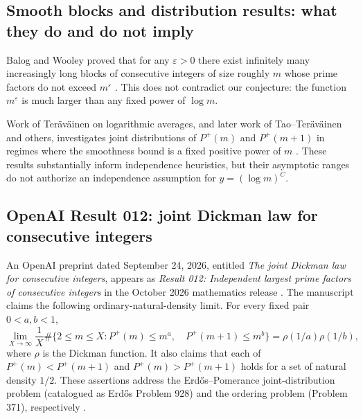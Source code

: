 \documentclass[11pt,letterpaper]{article}
\theoremstyle{remark}
\newcommand{\GPF}{P^{+}}
\begin{document}
\subsection{Smooth blocks and distribution results: what they do and do not imply}
Balog and Wooley proved that for any $\varepsilon>0$ there exist
infinitely many increasingly long blocks of consecutive integers
of size roughly $m$ whose prime factors do not exceed $m^\varepsilon$
\cite{BalogWooley}. This does not contradict our conjecture:
the function $m^\varepsilon$ is much larger than any fixed
power of $\log m$.

Work of Ter\"av\"ainen on logarithmic averages, and later work
of Tao--Ter\"av\"ainen and others, investigates joint distributions
of $P^+(m)$ and $P^+(m+1)$ in regimes where the smoothness bound
is a fixed positive power of $m$ \cite{Teravainen2018,TaoTeravainen2019,Wang2021}.
These results substantially inform independence heuristics, but their
asymptotic ranges do not authorize an independence assumption for
$y=(\log m)^C$.

\subsection{OpenAI Result 012: joint Dickman law for consecutive integers}
\label{subsec:result012}
An OpenAI preprint dated September 24, 2026, entitled
\emph{The joint Dickman law for consecutive integers}, appears as
\emph{Result 012: Independent largest prime factors of consecutive
integers} in the October 2026 mathematics release
\cite{OpenAI2026Dickman,OpenAIMathRepository}. The manuscript claims the
following ordinary-natural-density limit. For every fixed pair
$0<a,b<1$,
\begin{equation}\label{eq:joint-dickman}
\lim_{X\to\infty}\frac{1}{X}\#\Big\{2\le m\le X:
\GPF(m)\le m^a,\quad\GPF(m+1)\le m^b\Big\}
=\rho(1/a)\rho(1/b),
\end{equation}
where $\rho$ is the Dickman function. It also claims that each of
$\GPF(m)<\GPF(m+1)$ and $\GPF(m)>\GPF(m+1)$ holds for a set of
natural density $1/2$. These assertions address the Erd\H{o}s--Pomerance
joint-distribution problem (catalogued as Erd\H{o}s Problem 928) and the
ordering problem (Problem 371), respectively
\cite{OpenAI2026Dickman,Erdos928Review}.
\end{document}
